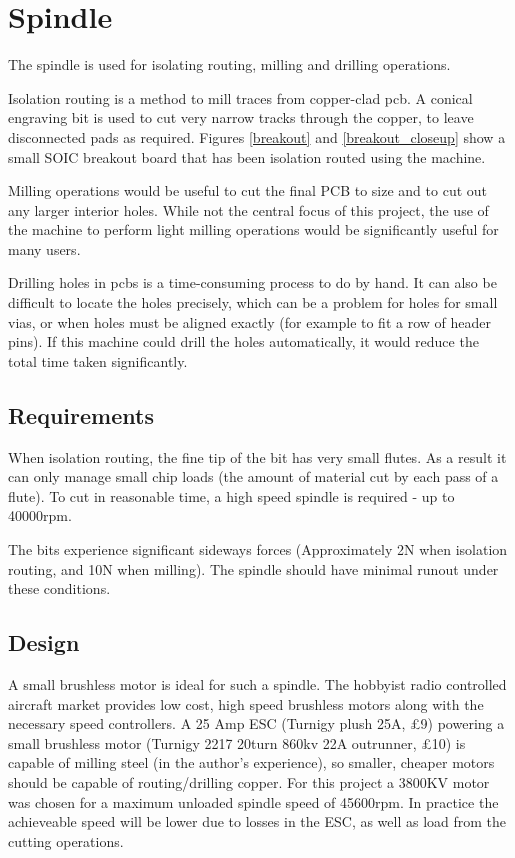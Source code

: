 \section{Spindle}
The spindle is used for isolating routing, milling and drilling operations.

Isolation routing is a method to mill traces from copper-clad pcb. A conical engraving bit is used to cut very narrow tracks through
the copper, to leave disconnected pads as required. Figures \ref{breakout} and \ref{breakout_closeup} show a small SOIC breakout board that has been isolation routed using the machine. 


Milling operations would be useful to cut the final PCB to size and to
cut out any larger interior holes. While not the central focus of this
project, the use of the machine to perform light milling operations
would be significantly useful for many users.

Drilling holes in pcbs is a time-consuming process to do by hand. It can also be difficult to locate the holes precisely, which can be a problem
for holes for small vias, or when holes must be aligned exactly (for example to fit a row of header pins). If this machine could drill the holes automatically,
it would reduce the total time taken significantly.

\subsection{Requirements}
When isolation routing, the fine tip of the bit has very small flutes. As a result it can only manage
small chip loads (the amount of material cut by each pass of a flute). To cut in reasonable time, a high speed spindle is required - up to 40000rpm.

The bits experience significant sideways forces (Approximately 2N when isolation routing, and 10N when milling). The spindle
should have minimal runout under these conditions.

\subsection{Design}
A small brushless motor is ideal for such a spindle. The hobbyist radio
controlled aircraft market provides low cost, high speed brushless motors
along with the necessary speed controllers. A 25 Amp \gls{ESC} 
(Turnigy plush 25A, \pounds 9) powering a small brushless motor 
(Turnigy 2217 20turn 860kv 22A outrunner, \pounds 10) is capable of milling
steel (in the author's experience), so smaller, cheaper motors should be 
capable of routing/drilling copper. For this project a 3800KV motor was
chosen for a maximum unloaded spindle speed of 45600rpm. In practice the
achieveable speed will be lower due to losses in the ESC, as well as load
from the cutting operations.

